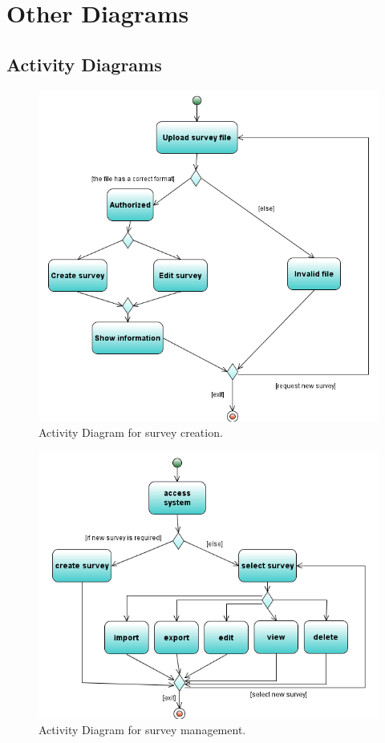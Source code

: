 \documentclass[a4paper,12pt,oneside]{report}
\begin{document}
\section{Other Diagrams}
\subsection{Activity Diagrams}
\begin{figure}[h!]
  \begin{center}
   \includegraphics[width=13.5cm]{pics/Activity.png}
  \end{center}
\caption{Activity Diagram for survey creation.}
\end{figure}

\begin{figure}[!hp]
  \begin{center}
   \includegraphics[width=13.8cm]{pics/Activity2.png}
  \end{center}
\caption{Activity Diagram for survey management.}
\end{figure}
\end{document}
